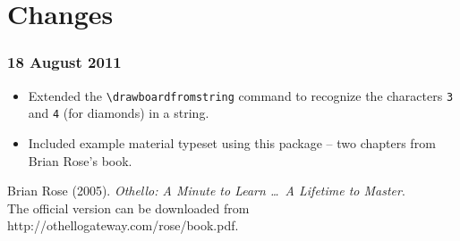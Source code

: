 \documentclass[a4paper,12pt]{article}
\begin{document}
\section{Changes}
\subsubsection*{18 August 2011}
\begin{itemize}
\item Extended the \verb=\drawboardfromstring= command to recognize the characters \verb=3= and \verb=4= (for diamonds) in a string.
\item Included example material typeset using this package -- two chapters from Brian Rose's book. 
\end{itemize}


\begin{thebibliography}{1}
 Brian Rose (2005). \emph{Othello: A Minute to Learn \ldots\ A Lifetime to Master}.\\[6pt]
The official version can be downloaded from http://othellogateway.com/rose/book.pdf.
\end{thebibliography}

\clearpage



\end{document}
